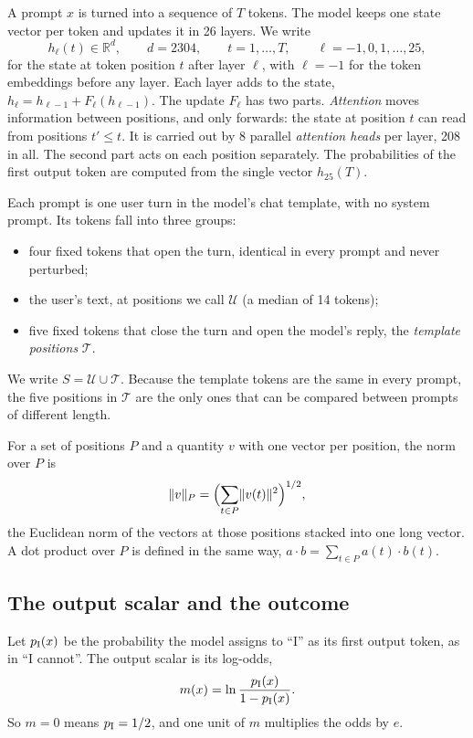 \documentclass[11pt]{article}
\newcommand{\cT}{\mathcal{T}}
\newcommand{\cU}{\mathcal{U}}
\newcommand{\nrm}[2]{\lVert #1\rVert_{#2}}
\begin{document}
A prompt $x$ is turned into a sequence of $T$ tokens. The model keeps one state vector per token and updates it in 26 layers. We write
\begin{equation}
h_\ell(t)\in\mathbb{R}^d,\qquad d=2304,\qquad t=1,\dots,T,\qquad \ell=-1,0,1,\dots,25,
\end{equation}
for the state at token position $t$ after layer $\ell$, with $\ell=-1$ for the token embeddings before any layer. Each layer adds to the state, $h_\ell=h_{\ell-1}+F_\ell(h_{\ell-1})$. The update $F_\ell$ has two parts. \emph{Attention} moves information between positions, and only forwards: the state at position $t$ can read from positions $t'\le t$. It is carried out by 8 parallel \emph{attention heads} per layer, 208 in all. The second part acts on each position separately. The probabilities of the first output token are computed from the single vector $h_{25}(T)$.

Each prompt is one user turn in the model's chat template, with no system prompt. Its tokens fall into three groups:
\begin{itemize}
\item four fixed tokens that open the turn, identical in every prompt and never perturbed;
\item the user's text, at positions we call $\cU$ (a median of 14 tokens);
\item five fixed tokens that close the turn and open the model's reply, the \emph{template positions} $\cT$.
\end{itemize}
We write $S=\cU\cup\cT$. Because the template tokens are the same in every prompt, the five positions in $\cT$ are the only ones that can be compared between prompts of different length.

For a set of positions $P$ and a quantity $v$ with one vector per position, the norm over $P$ is
\begin{equation}
\nrm{v}{P}=\Bigl(\sum_{t\in P}\lVert v(t)\rVert^2\Bigr)^{1/2},
\label{eq:norm}
\end{equation}
the Euclidean norm of the vectors at those positions stacked into one long vector. A dot product over $P$ is defined in the same way, $a\cdot b=\sum_{t\in P}a(t)\cdot b(t)$.

\subsection{The output scalar and the outcome}
\label{sec:mdef}

Let $p_{\rm I}(x)$ be the probability the model assigns to ``I'' as its first output token, as in ``I cannot''. The output scalar is its log-odds,
\begin{equation}
m(x)=\ln\frac{p_{\rm I}(x)}{1-p_{\rm I}(x)} .
\label{eq:m}
\end{equation}
So $m=0$ means $p_{\rm I}=1/2$, and one unit of $m$ multiplies the odds by $e$.
\end{document}
